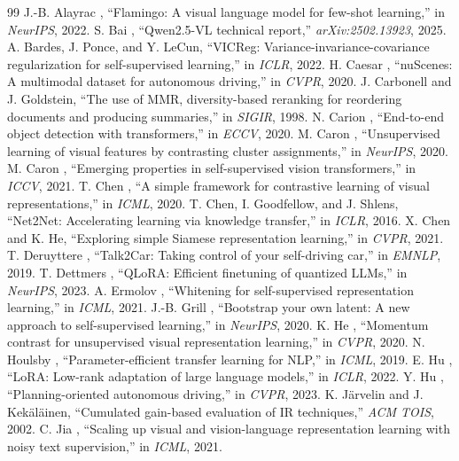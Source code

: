 \documentclass[10pt,twocolumn,letterpaper]{article}
\begin{document}
\begin{thebibliography}{99}\itemsep0pt\small
{} J.-B. Alayrac \etal, ``Flamingo: A visual language model for few-shot learning,'' in \emph{NeurIPS}, 2022.
 S. Bai \etal, ``Qwen2.5-VL technical report,'' \emph{arXiv:2502.13923}, 2025.
 A. Bardes, J. Ponce, and Y. LeCun, ``VICReg: Variance-invariance-covariance regularization for self-supervised learning,'' in \emph{ICLR}, 2022.
 H. Caesar \etal, ``nuScenes: A multimodal dataset for autonomous driving,'' in \emph{CVPR}, 2020.
 J. Carbonell and J. Goldstein, ``The use of MMR, diversity-based reranking for reordering documents and producing summaries,'' in \emph{SIGIR}, 1998.
 N. Carion \etal, ``End-to-end object detection with transformers,'' in \emph{ECCV}, 2020.
 M. Caron \etal, ``Unsupervised learning of visual features by contrasting cluster assignments,'' in \emph{NeurIPS}, 2020.
 M. Caron \etal, ``Emerging properties in self-supervised vision transformers,'' in \emph{ICCV}, 2021.
 T. Chen \etal, ``A simple framework for contrastive learning of visual representations,'' in \emph{ICML}, 2020.
 T. Chen, I. Goodfellow, and J. Shlens, ``Net2Net: Accelerating learning via knowledge transfer,'' in \emph{ICLR}, 2016.
 X. Chen and K. He, ``Exploring simple Siamese representation learning,'' in \emph{CVPR}, 2021.
 T. Deruyttere \etal, ``Talk2Car: Taking control of your self-driving car,'' in \emph{EMNLP}, 2019.
 T. Dettmers \etal, ``QLoRA: Efficient finetuning of quantized LLMs,'' in \emph{NeurIPS}, 2023.
 A. Ermolov \etal, ``Whitening for self-supervised representation learning,'' in \emph{ICML}, 2021.
 J.-B. Grill \etal, ``Bootstrap your own latent: A new approach to self-supervised learning,'' in \emph{NeurIPS}, 2020.
 K. He \etal, ``Momentum contrast for unsupervised visual representation learning,'' in \emph{CVPR}, 2020.
 N. Houlsby \etal, ``Parameter-efficient transfer learning for NLP,'' in \emph{ICML}, 2019.
 E. Hu \etal, ``LoRA: Low-rank adaptation of large language models,'' in \emph{ICLR}, 2022.
 Y. Hu \etal, ``Planning-oriented autonomous driving,'' in \emph{CVPR}, 2023.
 K. J\"arvelin and J. Kek\"al\"ainen, ``Cumulated gain-based evaluation of IR techniques,'' \emph{ACM TOIS}, 2002.
 C. Jia \etal, ``Scaling up visual and vision-language representation learning with noisy text supervision,'' in \emph{ICML}, 2021.

\end{thebibliography}
\end{document}
